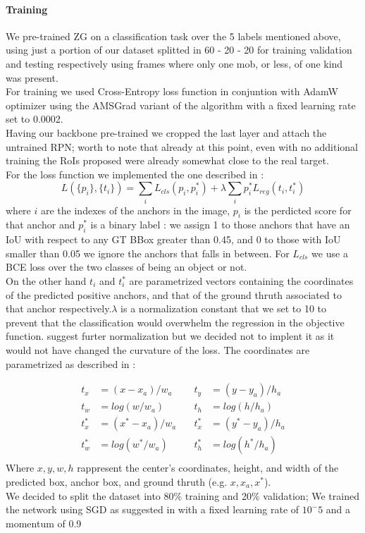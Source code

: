 \documentclass[10pt,journal,cspaper,compsoc]{IEEEtran}
\begin{document}
    \paragraph{Training}%
	    We pre-trained ZG on a classification task over the 5 labels mentioned above,  using just a portion of our dataset splitted in 60 - 20 - 20 for training validation and testing respectively using frames where only one mob, or less,  of one kind was present.\\ For training we used Cross-Entropy loss function in conjuntion with AdamW optimizer using the AMSGrad variant of the algorithm            	    with a fixed learning rate set to 0.0002.\\
	Having our backbone pre-trained we cropped the last layer and attach the untrained RPN; worth to note that already at this point, even with no additional training the RoIs proposed were already somewhat close to the real target.\\ For the loss function we implemented the one described in \cite{arxiv:FasterRCNN}:
	$$
	L(\{p_i\}, \{t_i\}) = \sum_i  L_{cls}(p_i, p_i^*) +\lambda \sum_i p_i^* L_{reg}(t_i, t_i^*)
	$$
	where $i$ are the indexes of the anchors in the image, $p_i$ is the perdicted score for that anchor and $p_i^*$ is a binary label : we assign 1 to those anchors that have an IoU with respect to any GT BBox greater than 0.45, and 0 to those with IoU smaller than 0.05 we ignore the anchors that falls in between. For $L_{cls}$  we use a BCE loss over the two classes of being an object or not. \\On the other hand $t_i$ and $t_i^*$ are parametrized vectors containing the coordinates of the predicted positive anchors, and that of the ground thruth associated to that anchor respectively.$\lambda$ is a normalization constant that we set to 10 to prevent that the classification would overwhelm the regression in the objective function. \cite{arxiv:FastRCNN} suggest furter normalization but we decided not to implent it as it would not have changed the curvature of the loss. The coordinates are parametrized as described in \cite{arxiv:FasterRCNN} : 

\begin{equation}
\begin{aligned}
t_x &= (x - x_a)/w_a \quad  &t_y &=(y - y_a)/h_a \\
t_w &= log(w/w_a) \quad &t_h &= log (h/h_a) \\
t_x^* &= (x^* - x_a)/w_a \quad &t_x^* &= (y^* - y_a)/h_a \\
t_w^* &= log(w^*/w_a) \quad  &t_h^*  &= log(h^*/h_a) \\
\end{aligned}
\end{equation}
Where $x,y,w,h$ rappresent the center's coordinates, height, and width of the predicted box, anchor box, and ground thruth (e.g. $x, x_a, x^*$).\\ We decided to split the dataset into 80\% training and 20\% validation; We trained the network using SGD as suggested in \cite{arxiv:FasterRCNN} with a fixed learning rate of $10^-5$ and a momentum of 0.9
    
\end{document}
